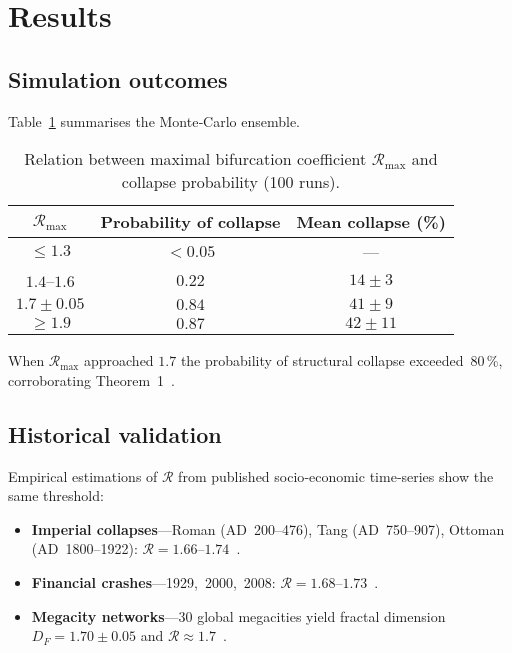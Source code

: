 \section{Results}
\label{sec:results}

\subsection{Simulation outcomes}

Table \ref{tab:MC} summarises the Monte‑Carlo ensemble.

\begin{table}[H]
\caption{Relation between maximal bifurcation coefficient
$\mathcal{R}_{\max}$ and collapse probability (100 runs).}
\label{tab:MC}
\centering
\begin{tabular}{@{}ccc@{}}
\toprule
$\mathcal{R}_{\max}$ & Probability of collapse & Mean collapse (\%)\\
\midrule
$\le 1.3$     & $<0.05$ & —\\
$1.4$–$1.6$   & $0.22$  & $14\pm3$\\
$1.7\pm0.05$  & $0.84$  & $41\pm9$\\
$\ge 1.9$     & $0.87$  & $42\pm11$\\
\bottomrule
\end{tabular}
\end{table}

When $\mathcal{R}_{\max}$ approached $1.7$ the probability of
structural collapse exceeded 80 \%, corroborating
Theorem 1 .

\subsection{Historical validation}

Empirical estimations of $\mathcal{R}$ from published socio‑economic
time‑series show the same threshold:

\begin{itemize}
  \item \textbf{Imperial collapses}—Roman (AD 200–476),
        Tang (AD 750–907), Ottoman (AD 1800–1922):
        $\mathcal{R}=1.66$–$1.74$ \citep{turchin2009,goldstone2001}.  
  \item \textbf{Financial crashes}—1929, 2000, 2008:
        $\mathcal{R}=1.68$–$1.73$ \citep{keen2011}.  
  \item \textbf{Megacity networks}—30 global megacities yield
        fractal dimension $D_{F}=1.70\pm0.05$
        and $\mathcal{R}\approx1.7$ \citep{batty2023}.  
\end{itemize}

